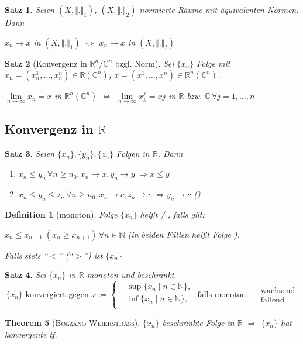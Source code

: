 \documentclass[ngerman,a4paper]{report}
\theoremstyle{break}
\newtheorem{theorem}{Theorem}[section]
\newtheorem{satz}[theorem]{Satz}
\newtheorem*{definition}{Definition}
\newcommand{\person}[1]{\textsc{#1}}
\begin{document}
\begin{satz}
	Seien $(X,\Vert .\Vert_1)$, $(X,\Vert.\Vert_2)$ normierte Räume mit äquivalenten Normen. Dann
	
	$x_n\rightarrow x$ in $(X,\Vert.\Vert_1)$ $\Leftrightarrow$ $x_n\rightarrow x$ in $(X,\Vert.\Vert_2)$
\end{satz}
\begin{satz}[Konvergenz in $\mathbb{R}^n$/$\mathbb{C}^n$ bzgl. Norm]
	Sei $\{x_n\}$ Folge mit $x_n = (x_n^1, \dotsc, x_n^n)\in\mathbb{R} (\mathbb{C}^n)$, $x=(x^1, \dotsc,x^n)\in\mathbb{R}^n (\mathbb{C}^n)$.
	
	$\lim\limits_{n\rightarrow\infty} x_n = x$ in $\mathbb{R}^n (\mathbb{C}^n)$ $\Leftrightarrow$ $\lim\limits_{n\rightarrow\infty} x_k^j = xj$ in $\mathbb{R}$ bzw. $\mathbb{C}\,\forall j=1,\dotsc,n$
\end{satz}
\addtocounter{theorem}{3}
\subsection*{Konvergenz in $\mathbb{R}$}
\begin{satz}
	Seien $\{x_n\},\{y_n\},\{z_n\}$ Folgen in $\mathbb{R}$. Dann
	\begin{enumerate}[label={\arabic*)}]
		\item $x_n \le y_n\,\forall n\ge n_0, x_n\rightarrow x, y_n\rightarrow y\;\Rightarrow x\le y$
		\item $x_n\le y_n\le z_n\,\forall n\ge n_0, x_n\rightarrow c,z_n\rightarrow c \;\Rightarrow y_n\rightarrow c$ ()
	\end{enumerate}
\end{satz}

\begin{definition}[monoton]
	Folge $\{x_n\}$ heißt  / , falls gilt:
	
	$x_n \le x_{n-1}\;(x_n\ge x_{n+1})\,\forall n\in\mathbb{N}$ (in beiden Fällen heißt Folge ).
	
	Falls stets "`$<$"' ("`$>$"') ist $\{x_n\}$ 
\end{definition}
\begin{satz}
	Sei $\{x_n\}$ in $\mathbb{R}$ monoton und beschränkt.\[
	\{x_n\}\text{ konvergiert gegen }x:=
	\left\lbrace
		\begin{aligned}
			&\sup \{x_n \mid n\in\mathbb{N}\}, \\
			&\inf\{x_n \mid n\in\mathbb{N}\}, \\
		\end{aligned}
	\right.
	\text{ falls monoton }\;
	\begin{aligned}
		&\text{wachsend}\\
		&\text{fallend}
	\end{aligned}
	\]
\end{satz}
\addtocounter{theorem}{2}
\begin{theorem}[\person{Bolzano}-\person{Weierstraß}]\label{bolzano_weierstrass}
	$\{x_n\}$ beschränkte Folge in $\mathbb{R}$ $\Rightarrow$ $\{x_n\}$ hat konvergente \gls{tf}.
\end{theorem}
\end{document}
